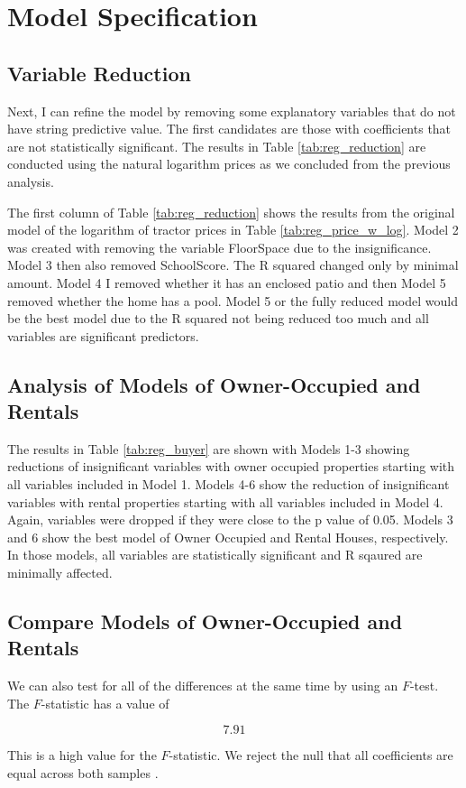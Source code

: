 \section{Model Specification}

\subsection{Variable Reduction}

Next, I can refine the model by removing some explanatory variables that do not have string predictive value. 
The first candidates are those with coefficients that are not statistically significant. 
The results in Table \ref{tab:reg_reduction} are conducted using the natural logarithm prices as we concluded from the previous analysis.



The first column of Table \ref{tab:reg_reduction}
shows the results from the original model of
the logarithm of tractor prices in Table \ref{tab:reg_price_w_log}. 
Model 2 was created with removing the variable FloorSpace due to the insignificance.
Model 3 then also removed SchoolScore. The R squared changed only by minimal amount.
Model 4 I removed whether it has an enclosed patio and then Model 5 removed whether the home has a pool.
Model 5 or the fully reduced model would be the best model due to the R squared not being reduced too much and all variables are significant predictors.

\clearpage
\pagebreak
\subsection{Analysis of Models of Owner-Occupied and Rentals}
The results in Table \ref{tab:reg_buyer} are shown with Models 1-3 showing reductions of insignificant variables with owner occupied properties starting with all variables included in Model 1. Models 4-6 show the reduction of insignificant variables with rental properties starting with all variables included in Model 4. Again, variables were dropped if they were close to the p value of 0.05.
Models 3 and 6 show the best model of Owner Occupied and Rental Houses, respectively. In those models, all variables are statistically significant and R sqaured are minimally affected.


\pagebreak
\clearpage
\subsection{Compare Models of Owner-Occupied and Rentals}


We can also test for all of the differences at the same time
by using an $F$-test.  
% 
The $F$-statistic has a value of 

$$ 
7.91
$$

This is a high value for the $F$-statistic. 
We reject the null that all 
coefficients are equal across both samples .




%
